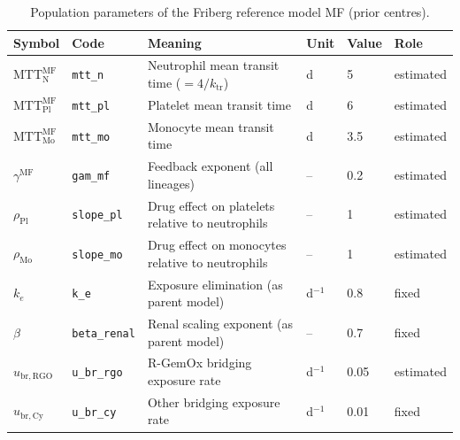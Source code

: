 \begin{table}[!htbp]
\centering
\footnotesize
\setlength{\tabcolsep}{3.5pt}
\caption{Population parameters of the Friberg reference model MF (prior centres).}
\label{tab:mf}
\begin{tabular}{ll>{\raggedright\arraybackslash}p{6cm}lll}
\toprule
Symbol & Code & Meaning & Unit & Value & Role \\
\midrule
$\mathrm{MTT}^{\mathrm{MF}}_{\mathrm{N}}$ & \texttt{mtt\_n} & Neutrophil mean transit time ($=4/k_{\mathrm{tr}}$) & d & 5 & estimated \\
$\mathrm{MTT}^{\mathrm{MF}}_{\mathrm{Pl}}$ & \texttt{mtt\_pl} & Platelet mean transit time & d & 6 & estimated \\
$\mathrm{MTT}^{\mathrm{MF}}_{\mathrm{Mo}}$ & \texttt{mtt\_mo} & Monocyte mean transit time & d & 3.5 & estimated \\
$\gamma^{\mathrm{MF}}$ & \texttt{gam\_mf} & Feedback exponent (all lineages) & -- & 0.2 & estimated \\
$\rho_{\mathrm{Pl}}$ & \texttt{slope\_pl} & Drug effect on platelets relative to neutrophils & -- & 1 & estimated \\
$\rho_{\mathrm{Mo}}$ & \texttt{slope\_mo} & Drug effect on monocytes relative to neutrophils & -- & 1 & estimated \\
$k_e$ & \texttt{k\_e} & Exposure elimination (as parent model) & d$^{-1}$ & 0.8 & fixed \\
$\beta$ & \texttt{beta\_renal} & Renal scaling exponent (as parent model) & -- & 0.7 & fixed \\
$u_{\mathrm{br,RGO}}$ & \texttt{u\_br\_rgo} & R-GemOx bridging exposure rate & d$^{-1}$ & 0.05 & estimated \\
$u_{\mathrm{br,Cy}}$ & \texttt{u\_br\_cy} & Other bridging exposure rate & d$^{-1}$ & 0.01 & fixed \\
\bottomrule
\end{tabular}
\end{table}
